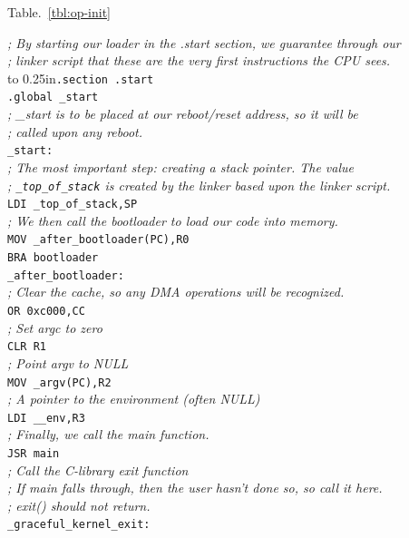 \documentclass{gqtekspec}
\begin{document}
Table.~\ref{tbl:op-init}
\begin{table}\begin{center}
\begin{tabbing}
{\em ; By starting our loader in the .start section, we guarantee through our}\\
{\em ; linker script that these are the very first instructions the CPU sees.}\\
\hbox to 0.25in{}\={\tt .section .start} \\
\>	{\tt .global \_start} \\
{\em ; \_start is to be placed at our reboot/reset address, so it will be}\\
{\em ; called upon any reboot.}\\
{\tt \_start:} \\
%
%
\> {\em ; The most important step: creating a stack pointer.  The value}\\
\> {\em ; {\tt \_top\_of\_stack} is created by the linker based upon the linker script.}\\
\>	{\tt LDI \_top\_of\_stack,SP} \\
%
%
\> {\em ; We then call the bootloader to load our code into memory.}\\
\>	{\tt MOV \_after\_bootloader(PC),R0} \\
\>	{\tt BRA bootloader} \\
{\tt \_after\_bootloader:} \\
%
%
\>	{\em ; Clear the cache, so any DMA operations will be recognized.}\\
\>	{\tt OR	0xc000,CC} \\
%
\>	{\em ; Set argc to zero}\\
\>	{\tt CLR	R1} \\
\>	{\em ; Point argv to NULL}\\
\>	{\tt MOV	\_argv(PC),R2} \\
\>	{\em ; A pointer to the environment (often NULL)}\\
\>	{\tt LDI	\_\_env,R3} \\
%
%
\>	{\em ; Finally, we call the main function.}\\
\>	{\tt JSR	main}\\
%
%
{\em ; Call the C-library exit function}\\
{\em ; If main falls through, then the user hasn't done so, so call it here.}\\
{\em ; exit() should not return.}\\
{\tt \_graceful\_kernel\_exit:} \\

\end{tabbing}
\end{center}
\end{table}
\end{document}
